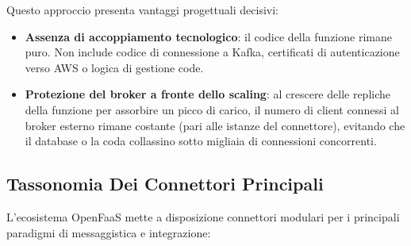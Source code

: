 \documentclass[11pt, a4paper]{article}
\begin{document}
Questo approccio presenta vantaggi progettuali decisivi:
\begin{itemize}[noitemsep]
    \item \textbf{Assenza di accoppiamento tecnologico}: il codice della funzione rimane puro. Non include codice di connessione a Kafka, certificati di autenticazione verso AWS o logica di gestione code.
    \item \textbf{Protezione del broker a fronte dello scaling}: al crescere delle repliche della funzione per assorbire un picco di carico, il numero di client connessi al broker esterno rimane costante (pari alle istanze del connettore), evitando che il database o la coda collassino sotto migliaia di connessioni concorrenti.
\end{itemize}

\subsection{Tassonomia Dei Connettori Principali}
L'ecosistema OpenFaaS mette a disposizione connettori modulari per i principali paradigmi di messaggistica e integrazione:
\end{document}
